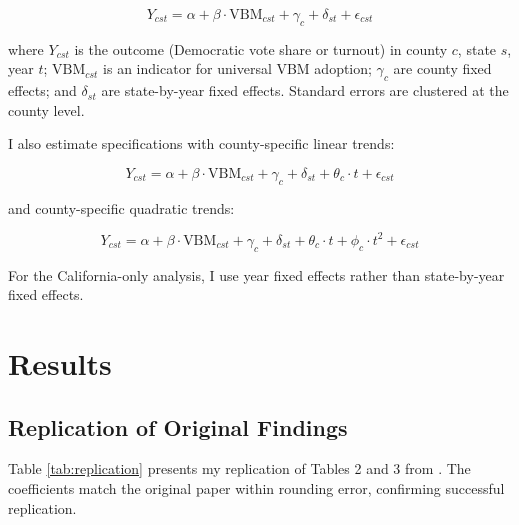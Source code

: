 \documentclass[12pt]{article}
\begin{document}
\begin{equation}
Y_{cst} = \alpha + \beta \cdot \text{VBM}_{cst} + \gamma_c + \delta_{st} + \epsilon_{cst}
\end{equation}

where $Y_{cst}$ is the outcome (Democratic vote share or turnout) in county $c$, state $s$, year $t$; $\text{VBM}_{cst}$ is an indicator for universal VBM adoption; $\gamma_c$ are county fixed effects; and $\delta_{st}$ are state-by-year fixed effects. Standard errors are clustered at the county level.

I also estimate specifications with county-specific linear trends:

\begin{equation}
Y_{cst} = \alpha + \beta \cdot \text{VBM}_{cst} + \gamma_c + \delta_{st} + \theta_c \cdot t + \epsilon_{cst}
\end{equation}

and county-specific quadratic trends:

\begin{equation}
Y_{cst} = \alpha + \beta \cdot \text{VBM}_{cst} + \gamma_c + \delta_{st} + \theta_c \cdot t + \phi_c \cdot t^2 + \epsilon_{cst}
\end{equation}

For the California-only analysis, I use year fixed effects rather than state-by-year fixed effects.

\section{Results}

\subsection{Replication of Original Findings}

Table \ref{tab:replication} presents my replication of Tables 2 and 3 from \citet{thompson2020universal}. The coefficients match the original paper within rounding error, confirming successful replication.
\end{document}
